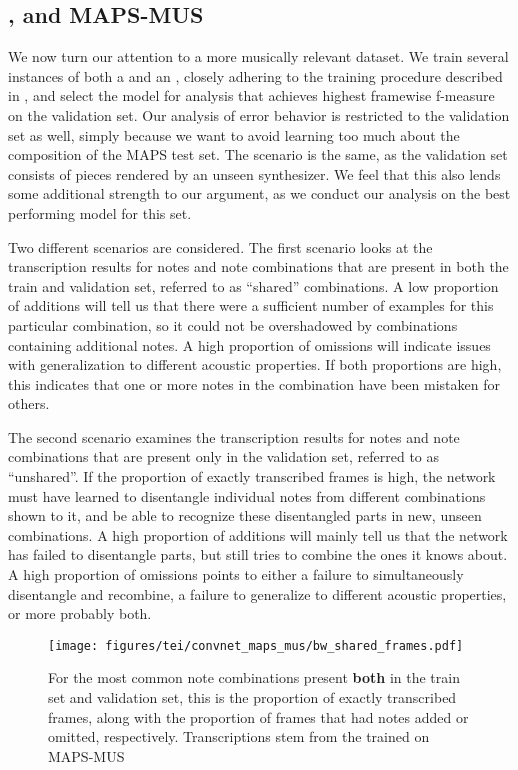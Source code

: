 \subsection{\ConvNetNPS, \AUNet and MAPS-MUS}
\label{sec:results_maps_mus}
We now turn our attention to a more musically relevant dataset. We train several instances of both a \ConvNet and an \AUNetNPS, closely adhering to the training procedure described in \cite{Kelz_Dorfer_Korzeniowski_Boeck_Arzt_Widmer_2016}, and select the model for analysis that achieves highest framewise f-measure on the validation set. Our analysis of error behavior is restricted to the validation set as well, simply because we want to avoid learning too much about the composition of the MAPS test set. The scenario is the same, as the validation set consists of pieces rendered by an unseen synthesizer. We feel that this also lends some additional strength to our argument, as we conduct our analysis on the best performing model for this set.

Two different scenarios are considered.
The first scenario looks at the transcription results for notes and note combinations that are present in both the train and validation set, referred to as ``shared'' combinations. A low proportion of additions will tell us that there were a sufficient number of examples for this particular combination, so it could not be overshadowed by combinations containing additional notes. A high proportion of omissions will indicate issues with generalization to different acoustic properties. If both proportions are high, this indicates that one or more notes in the combination have been mistaken for others.

The second scenario examines the transcription results for notes and note combinations that are present only in the validation set, referred to as ``unshared''. If the proportion of exactly transcribed frames is high, the network must have learned to disentangle individual notes from different combinations shown to it, and be able to recognize these disentangled parts in new, unseen combinations. A high proportion of additions will mainly tell us that the network has failed to disentangle parts, but still tries to combine the ones it knows about. A high proportion of omissions points to either a failure to simultaneously disentangle and recombine, a failure to generalize to different acoustic properties, or more probably both.

\begin{figure}[ht]
  \centering
  \texttt{[image: figures/tei/convnet\_maps\_mus/bw\_shared\_frames.pdf]}
  \caption{For the most common note combinations present \textbf{both} in the train set and validation set, this is the proportion of exactly transcribed frames, along with the proportion of frames that had notes added or omitted, respectively. Transcriptions stem from the \ConvNet trained on MAPS-MUS \label{fig:convnet-maps-mus-shared}}
\end{figure}


